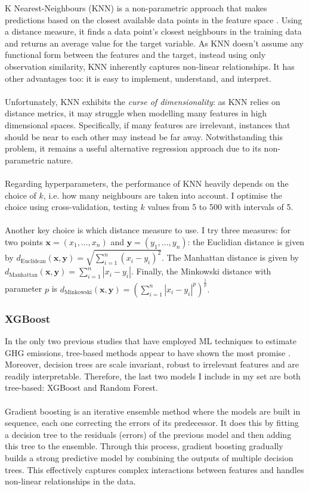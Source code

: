 \documentclass[12pt,twoside]{report}
\begin{document}
K Nearest-Neighbours (KNN) is a non-parametric approach that makes predictions based on the closest available data points in the feature space \cite{SilvermanJones1989}. Using a distance measure, it finds a data point's closest neighbours in the training data and returns an average value for the target variable. As KNN doesn't assume any functional form between the features and the target, instead using only observation similarity, KNN inherently captures non-linear relationships. It has other advantages too: it is easy to implement, understand, and interpret. 
\\\\
Unfortunately, KNN exhibits the \textit{curse of dimensionality}: as KNN relies on distance metrics, it may struggle when modelling many features in high dimensional spaces. Specifically, if many features are irrelevant, instances that should be near to each other may instead be far away. Notwithstanding this problem, it remains a useful alternative regression approach due to its non-parametric nature.
\\\\
Regarding hyperparameters, the performance of KNN heavily depends on the choice of $k$, i.e. how many neighbours are taken into account. I optimise the choice using cross-validation, testing $k$ values from 5 to 500 with intervals of 5. 
\\\\
Another key choice is which distance measure to use. I try three measures: for two points $\mathbf{x} = (x_{1}, \dots, x_{n})$ and $\mathbf{y} = (y_{1}, \dots, y_{n})$: the Euclidian distance is given by $d_{\text{Euclidean}}(\mathbf{x}, \mathbf{y}) = \sqrt{\sum_{i=1}^{n} (x_i - y_i)^2}$. The Manhattan distance is given by $d_{\text{Manhattan}}(\mathbf{x}, \mathbf{y}) = \sum_{i=1}^{n} |x_i - y_i|$. Finally, the Minkowski distance with parameter $p$ is $d_{\text{Minkowski}}(\mathbf{x}, \mathbf{y}) = \left( \sum_{i=1}^{n} |x_i - y_i|^p \right)^{\frac{1}{p}}.$ 


\subsubsection{XGBoost}

In the only two previous studies that have employed ML techniques to estimate GHG emissions, tree-based methods appear to have shown the most promise \cite{nguyen2021, Nguyenetal2023}. Moreover, decision trees are scale invariant, robust to irrelevant features and are readily interpretable. Therefore, the last two models I include in my set are both tree-based: XGBoost and Random Forest. 
\\\\
Gradient boosting is an iterative ensemble method where the models are built in sequence, each one correcting the errors of its predecessor. It does this by fitting a decision tree to the residuals (errors) of the previous model and then adding this tree to the ensemble. Through this process, gradient boosting gradually builds a strong predictive model by combining the outputs of multiple decision trees. This effectively captures complex interactions between features and handles non-linear relationships in the data.
\end{document}
